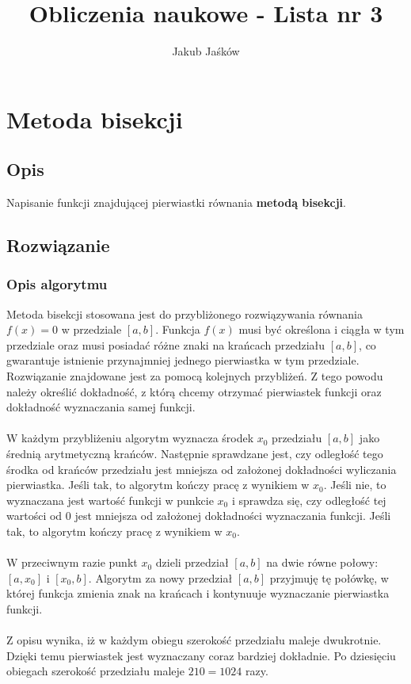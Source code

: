 \documentclass[10pt,a4paper, polish]{article}
\author{Jakub Jaśków}
\title{Obliczenia naukowe - Lista nr 3}
\begin{document}
\maketitle

\section{Metoda bisekcji}

\subsection*{Opis}
Napisanie funkcji znajdującej pierwiastki równania \textbf{metodą bisekcji}.
\subsection*{Rozwiązanie}
\subsubsection*{Opis algorytmu}
Metoda bisekcji stosowana jest do przybliżonego rozwiązywania równania $f(x) = 0$ w przedziale $[a,b]$. Funkcja $f(x)$ musi być określona i ciągła w tym przedziale oraz musi posiadać różne znaki na krańcach przedziału $[a,b]$, co gwarantuje istnienie przynajmniej jednego pierwiastka w tym przedziale. Rozwiązanie znajdowane jest za pomocą kolejnych przybliżeń. Z tego powodu należy określić dokładność, z którą chcemy otrzymać pierwiastek funkcji oraz dokładność wyznaczania samej funkcji.\\\\
W każdym przybliżeniu algorytm wyznacza środek $x_0$ przedziału $[a,b]$ jako średnią arytmetyczną krańców. Następnie sprawdzane jest, czy odległość tego środka od krańców przedziału jest mniejsza od założonej dokładności wyliczania pierwiastka. Jeśli tak, to algorytm kończy pracę z wynikiem w $x_0$. Jeśli nie, to wyznaczana jest wartość funkcji w punkcie $x_0$ i sprawdza się, czy odległość tej wartości od $0$ jest mniejsza od założonej dokładności wyznaczania funkcji. Jeśli tak, to algorytm kończy pracę z wynikiem w $x_0$.\\\\
W przeciwnym razie punkt $x_0$ dzieli przedział $[a,b]$ na dwie równe połowy: $[a,x_0]$ i $[x_0,b]$. Algorytm za nowy przedział $[a,b]$ przyjmuję tę połówkę, w której funkcja zmienia znak na krańcach i kontynuuje wyznaczanie pierwiastka funkcji.\\\\
Z opisu wynika, iż w każdym obiegu szerokość przedziału maleje dwukrotnie. Dzięki temu pierwiastek jest wyznaczany coraz bardziej dokładnie. Po dziesięciu obiegach szerokość przedziału maleje $210 = 1024$ razy.
\end{document}
